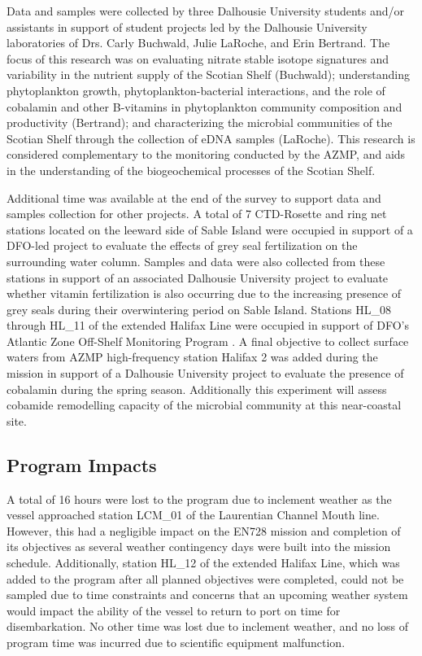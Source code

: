 \documentclass[12pt]{article}\usepackage[]{graphicx}\usepackage[]{color}
\begin{document}
Data and samples were collected by three Dalhousie University students and/or assistants in support of student projects led by the Dalhousie University laboratories of Drs. Carly Buchwald, Julie LaRoche, and Erin Bertrand. The focus of this research was on evaluating nitrate stable isotope signatures and variability in the nutrient supply of the Scotian Shelf (Buchwald); understanding phytoplankton growth, phytoplankton-bacterial interactions, and the role of cobalamin and other B-vitamins in phytoplankton community composition and productivity (Bertrand); and characterizing the microbial communities of the Scotian Shelf through the collection of eDNA samples (LaRoche). This research is considered complementary to the monitoring conducted by the AZMP, and aids in the understanding of the biogeochemical processes of the Scotian Shelf.

Additional time was available at the end of the survey to support data and samples collection for other projects. A total of 7 CTD-Rosette and ring net stations located on the leeward side of Sable Island were occupied in support of a DFO-led project to evaluate the effects of grey seal fertilization on the surrounding water column. Samples and data were also collected from these stations in support of an associated Dalhousie University project to evaluate whether vitamin fertilization is also occurring due to the increasing presence of grey seals during their overwintering period on Sable Island. Stations HL\_08 through HL\_11 of the extended Halifax Line were occupied in support of DFO's Atlantic Zone Off-Shelf Monitoring Program . A final objective to collect surface waters from AZMP high-frequency station Halifax 2 was added during the mission in support of a Dalhousie University project to evaluate the presence of cobalamin during the spring season. Additionally this experiment will assess cobamide remodelling capacity of the microbial community at this near-coastal site.

\subsection{Program Impacts}\label{impacts}

A total of 16 hours were lost to the program due to inclement weather as the vessel approached station LCM\_01 of the Laurentian Channel Mouth line. However, this had a negligible impact on the EN728 mission and completion of its objectives as several weather contingency days were built into the mission schedule. Additionally, station HL\_12 of the extended Halifax Line, which was added to the program after all planned objectives were completed, could not be sampled due to time constraints and concerns that an upcoming weather system would impact the ability of the vessel to return to port on time for disembarkation. No other time was lost due to inclement weather, and no loss of program time was incurred due to scientific equipment malfunction.
\end{document}
